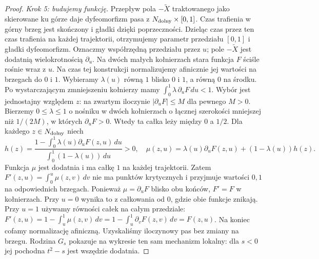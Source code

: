 \begin{proof}
\emph{Krok 5: budujemy funkcję.}
Przepływ pola $-\widetilde X$
traktowanego jako skierowane ku
górze daje dyfeomorfizm pasa
z $N_{\rm dolny}\times[0,1]$.
Czas trafienia w górny brzeg jest skończony
i gładki dzięki poprzeczności. Dzieląc czas przez
ten czas trafienia na każdej trajektorii, otrzymujemy
parametr przedziału $[0,1]$ i gładki dyfeomorfizm.
Oznaczmy współrzędną przedziału przez $u$; pole $-\widetilde X$
jest dodatnią wielokrotnością
$\partial_u$. Na dwóch małych
kołnierzach stara funkcja $F$
ściśle rośnie wraz z $u$.
Na czas tej konstrukcji normalizujemy
afinicznie jej wartości na brzegach
do $0$ i $1$.
Wybieramy $\lambda(u)$ równą $1$
blisko $0$ i $1$, a równą $0$
na środku. Po wystarczającym
zmniejszeniu kołnierzy mamy
$\int_0^1\lambda\,\partial_uF\,du<1$.
Wybór jest jednostajny względem $z$: na zwartym iloczynie
$|\partial_uF|\leq M$ dla pewnego $M>0$. Bierzemy
$0\leq\lambda\leq1$ o nośniku w dwóch kołnierzach
o łącznej szerokości mniejszej niż $1/(2M)$, w których
$\partial_uF>0$. Wtedy ta całka leży między $0$ a $1/2$.
Dla każdego $z\in N_{\rm dolny}$ niech
\[
 h(z)=
 \frac{1-\int_0^1\lambda(u)
                 \partial_uF(z,u)\,du}
      {\int_0^1(1-\lambda(u))\,du}>0,
 \quad
 \mu(z,u)=\lambda(u)\partial_uF(z,u)
            +(1-\lambda(u))h(z).
\]
Funkcja $\mu$ jest dodatnia i ma
całkę $1$ na każdej trajektorii.
Zatem $F'(z,u)=\int_0^u\mu(z,v)\,dv$
nie ma punktów krytycznych i przyjmuje
wartości $0,1$ na odpowiednich brzegach.
Ponieważ $\mu=\partial_uF$ blisko
obu końców, $F'=F$ w kołnierzach.
Przy $u=0$ wynika to z całkowania od $0$, gdzie obie funkcje
znikają. Przy $u=1$ używamy równości całek na całym przedziale:
$F'(z,u)=1-\int_u^1\mu(z,v)\,dv
=1-\int_u^1\partial_vF(z,v)\,dv=F(z,u)$.
Na koniec cofamy normalizację afiniczną.
Uzyskaliśmy iloczynowy pas bez
zmiany na brzegu. Rodzina $G_s$
pokazuje na wykresie ten sam
mechanizm lokalny: dla $s<0$
jej pochodna $t^2-s$ jest
wszędzie dodatnia.
\end{proof}

